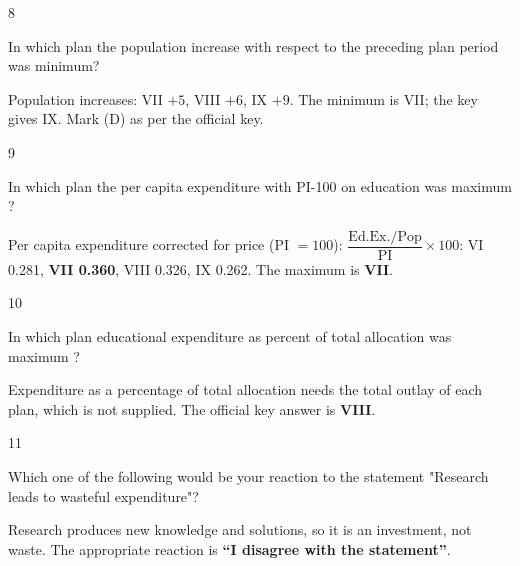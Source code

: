\begin{question}{8}
{In which plan the population increase with respect to the preceding plan period was minimum?\par}
\begin{explain}
Population increases: VII $+5$, VIII $+6$, IX $+9$. The minimum is VII; the key gives IX. Mark (D) as per the official key.
\end{explain}
\end{question}

\begin{question}{9}
{In which plan the per capita expenditure with PI-100 on education was maximum ?\par}
\begin{explain}
Per capita expenditure corrected for price (PI $=100$): $\dfrac{\text{Ed.Ex.}/\text{Pop}}{\text{PI}}\times100$: VI 0.281, \textbf{VII 0.360}, VIII 0.326, IX 0.262. The maximum is \textbf{VII}.
\end{explain}
\end{question}

\begin{question}{10}
{In which plan educational expenditure as percent of total allocation was maximum ?\par}
\begin{explain}
Expenditure as a percentage of total allocation needs the total outlay of each plan, which is not supplied. The official key answer is \textbf{VIII}.
\end{explain}
\end{question}

\begin{question}{11}
{Which one of the following would be your reaction to the statement "Research leads to wasteful expenditure"?\par}
\begin{explain}
Research produces new knowledge and solutions, so it is an investment, not waste. The appropriate reaction is \textbf{``I disagree with the statement''}.
\end{explain}
\end{question}

